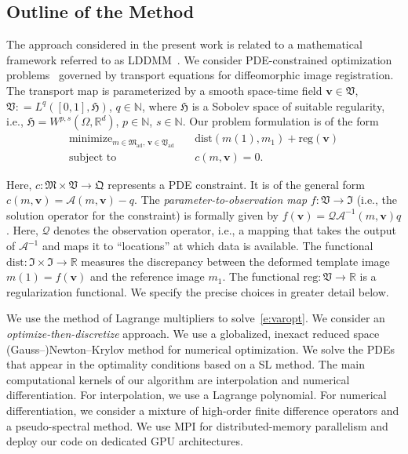 \documentclass[11pt]{amsart}
\newcommand\fs[1]{\ensuremath{\mathfrak{#1}}}
\newcommand\op[1]{\ensuremath{\mathcal{#1}}}
\newcommand{\defeq}{\ensuremath{\mathrel{\mathop:}=}}
\DeclareMathOperator*\minopt{\ensuremath{minimize}}
\newcommand{\reg}{\ensuremath{\text{reg}}}
\newcommand{\dist}{\ensuremath{\text{dist}}}
\newcommand{\st}{\ensuremath{\text{subject to}}}
\renewcommand{\vec}[1]{\ensuremath{\boldsymbol{#1}}}
\begin{document}
\subsection{Outline of the Method}

The approach considered in the present work is related to a mathematical framework referred to as LDDMM~\cite{Younes:2019a,Beg:2005a,Trouve:1995a,Trouve:1998a,Dupuis:1998a}. We consider PDE-constrained optimization problems~\cite{Borzi:2012a,Hinze:2009a,Antil:2018a,Mang:2018a} governed by transport equations for diffeomorphic image registration. The transport map is parameterized by a smooth space-time field $\vec{v} \in \fs{V}$, $\fs{V} \defeq L^q([0,1],\fs{H})$, $q\in \mathbb{N}$, where $\fs{H}$ is a Sobolev space of suitable regularity, i.e., $\fs{H} = W^{p,s}(\Omega,\mathbb{R}^d)$, $p\in\mathbb{N}$, $s\in\mathbb{N}$. Our problem formulation is of the form
\begin{subequations}
\label{e:varopt}
\begin{align}
\minopt_{m \in \fs{M}_{\text{ad}}, \, \vec{v} \in \fs{V}_{\text{ad}}}\quad
&\dist(m(1), m_1) + \reg(\vec{v})
\label{e:varopt:objective}
\\
\st\quad & c(m,\vec{v}) = 0.
\label{e:varopt:constraint}
\end{align}
\end{subequations}

\noindent Here, $c : \fs{M} \times \fs{V} \to \fs{Q}$ represents a PDE constraint. It is of the general form $c(m,\vec{v}) = \op{A}(m,\vec{v}) - q$. The \emph{parameter-to-observation map} $f : \fs{V} \to \fs{I}$ (i.e., the solution operator for the constraint) is formally given by $f(\vec{v}) = \op{Q} \op{A}^{-1}(m,\vec{v})q$. Here, $\op{Q}$ denotes the observation operator, i.e., a mapping that takes the output of $\op{A}^{-1}$ and maps it to ``locations'' at which data is available. The functional $\dist : \fs{I} \times \fs{I} \to \mathbb{R}$ measures the discrepancy between the deformed template image $m(1)= f(\vec{v})$ and the reference image $m_1$. The functional $\reg : \fs{V} \to \mathbb{R}$ is a regularization functional. We specify the precise choices in greater detail below.

We use the method of Lagrange multipliers to solve~\eqref{e:varopt}. We consider an \emph{optimize-then-discretize} approach. We use a globalized, inexact reduced space \mbox{(Gauss--)}Newton--Krylov method for numerical optimization. We solve the PDEs that appear in the optimality conditions based on a SL method. The main computational kernels of our algorithm are interpolation and numerical differentiation. For interpolation, we use a Lagrange polynomial. For numerical differentiation, we consider a mixture of high-order finite difference operators and a pseudo-spectral method. We use MPI for distributed-memory parallelism and deploy our code on dedicated GPU architectures.
\end{document}
